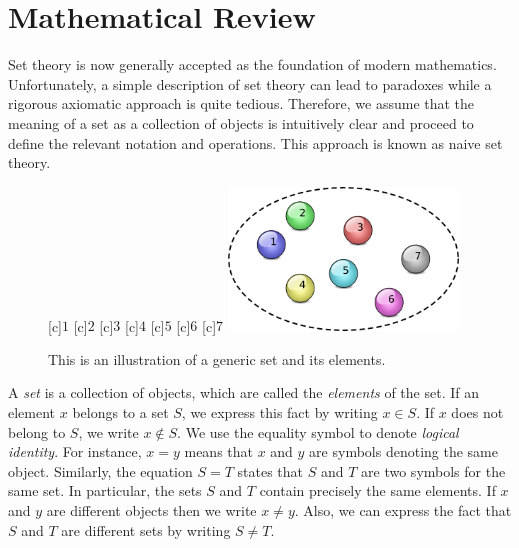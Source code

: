 \chapter{Mathematical Review}

Set theory is now generally accepted as the foundation of modern mathematics.
Unfortunately, a simple description of set theory can lead to paradoxes while a rigorous axiomatic approach is quite tedious.
Therefore, we assume that the meaning of a set as a collection of objects is intuitively clear and proceed to define the relevant notation and operations.
This approach is known as naive set theory.



\begin{figure}[htb]
\begin{center}
\begin{psfrags}
[c]{$1$}
[c]{$2$}
[c]{$3$}
[c]{$4$}
[c]{$5$}
[c]{$6$}
[c]{$7$}
\includegraphics[height=3.825cm]{Figures/1Chapter/basicset}
\end{psfrags}
\caption{This is an illustration of a generic set and its elements.}
\end{center}
\end{figure}

A \emph{set} is a collection of objects, which are called the \emph{elements} of the set.
If an element $x$ belongs to a set $S$, we express this fact by writing $x \in S$.
If $x$ does not belong to $S$, we write $x \notin S$.
We use the equality symbol to denote \emph{logical identity}.
For instance, $x = y$ means that $x$ and $y$ are symbols denoting the same object.
Similarly, the equation $S = T$ states that $S$ and $T$ are two symbols for the same set.
In particular, the sets $S$ and $T$ contain precisely the same elements.
If $x$ and $y$ are different objects then we write $x \neq y$.
Also, we can express the fact that $S$ and $T$ are different sets by writing $S \neq T$.


